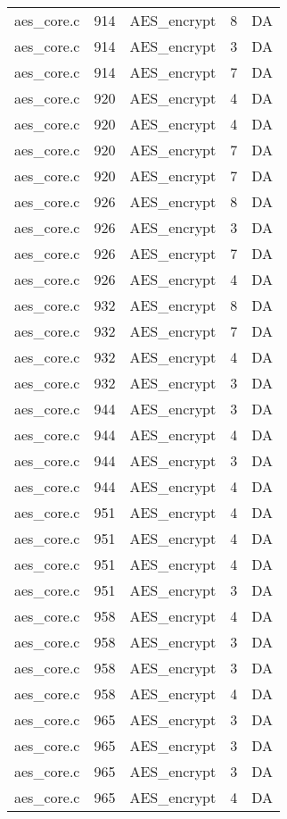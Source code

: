 \begin{table}
\begin{tabular}{lrlrr}
aes\_core.c& 914&AES\_encrypt&8 &DA\\
aes\_core.c& 914&AES\_encrypt&3 &DA\\
aes\_core.c& 914&AES\_encrypt&7 &DA\\
aes\_core.c& 920&AES\_encrypt&4 &DA\\
aes\_core.c& 920&AES\_encrypt&4 &DA\\
aes\_core.c& 920&AES\_encrypt&7 &DA\\
aes\_core.c& 920&AES\_encrypt&7 &DA\\
aes\_core.c& 926&AES\_encrypt&8 &DA\\
aes\_core.c& 926&AES\_encrypt&3 &DA\\
aes\_core.c& 926&AES\_encrypt&7 &DA\\
aes\_core.c& 926&AES\_encrypt&4 &DA\\
aes\_core.c& 932&AES\_encrypt&8 &DA\\
aes\_core.c& 932&AES\_encrypt&7 &DA\\
aes\_core.c& 932&AES\_encrypt&4 &DA\\
aes\_core.c& 932&AES\_encrypt&3 &DA\\
aes\_core.c& 944&AES\_encrypt&3 &DA\\
aes\_core.c& 944&AES\_encrypt&4 &DA\\
aes\_core.c& 944&AES\_encrypt&3 &DA\\
aes\_core.c& 944&AES\_encrypt&4 &DA\\
aes\_core.c& 951&AES\_encrypt&4 &DA\\
aes\_core.c& 951&AES\_encrypt&4 &DA\\
aes\_core.c& 951&AES\_encrypt&4 &DA\\
aes\_core.c& 951&AES\_encrypt&3 &DA\\
aes\_core.c& 958&AES\_encrypt&4 &DA\\
aes\_core.c& 958&AES\_encrypt&3 &DA\\
aes\_core.c& 958&AES\_encrypt&3 &DA\\
aes\_core.c& 958&AES\_encrypt&4 &DA\\
aes\_core.c& 965&AES\_encrypt&3 &DA\\
aes\_core.c& 965&AES\_encrypt&3 &DA\\
aes\_core.c& 965&AES\_encrypt&3 &DA\\
aes\_core.c& 965&AES\_encrypt&4 &DA\\
\hline
\end{tabular}
\renewcommand{\baselinestretch}{1.0}\selectfont
\end{table}
